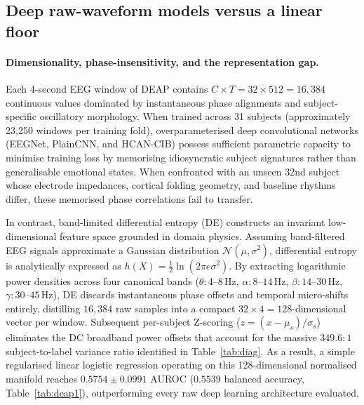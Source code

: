 \documentclass[a4paper,fleqn]{cas-sc}
\begin{document}
\FloatBarrier
\subsection{Deep raw-waveform models versus a linear floor}
\label{sec:deep_vs_linear}

\paragraph{Dimensionality, phase-insensitivity, and the representation gap.}
Each 4-second EEG window of DEAP contains $C \times T = 32 \times 512 = 16{,}384$ continuous values dominated by instantaneous phase alignments and subject-specific oscillatory morphology. When trained across 31 subjects (approximately 23,250 windows per training fold), overparameterised deep convolutional networks (EEGNet, PlainCNN, and HCAN-CIB) possess sufficient parametric capacity to minimise training loss by memorising idiosyncratic subject signatures rather than generalisable emotional states. When confronted with an unseen 32nd subject whose electrode impedances, cortical folding geometry, and baseline rhythms differ, these memorised phase correlations fail to transfer.

In contrast, band-limited differential entropy (DE) constructs an invariant low-dimensional feature space grounded in domain physics. Assuming band-filtered EEG signals approximate a Gaussian distribution $\mathcal{N}(\mu, \sigma^2)$, differential entropy is analytically expressed as $h(X) = \frac{1}{2}\ln(2\pi e \sigma^2)$. By extracting logarithmic power densities across four canonical bands ($\theta: 4$--$8$\,Hz, $\alpha: 8$--$14$\,Hz, $\beta: 14$--$30$\,Hz, $\gamma: 30$--$45$\,Hz), DE discards instantaneous phase offsets and temporal micro-shifts entirely, distilling $16{,}384$ raw samples into a compact $32 \times 4 = 128$-dimensional vector per window. Subsequent per-subject Z-scoring ($z = (x - \mu_s)/\sigma_s$) eliminates the DC broadband power offsets that account for the massive $349.6:1$ subject-to-label variance ratio identified in Table~\ref{tab:diag}. As a result, a simple regularised linear logistic regression operating on this 128-dimensional normalised manifold reaches $0.5754\pm0.0991$ AUROC ($0.5539$ balanced accuracy, Table~\ref{tab:deap1}), outperforming every raw deep learning architecture evaluated.
\end{document}
